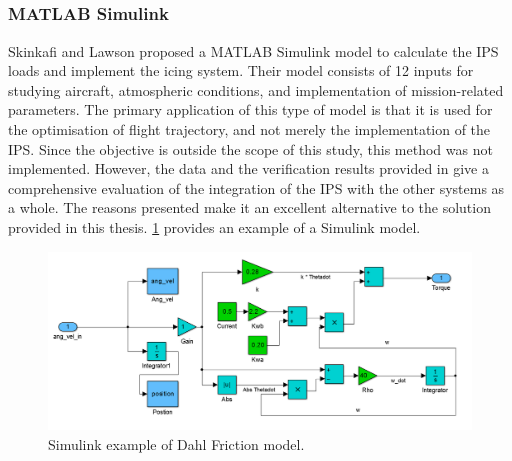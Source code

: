 \documentclass[english]{kththesis}
\begin{document}
\subsubsection {MATLAB Simulink \textsuperscript{\textregistered}}
Skinkafi and Lawson \cite{shinlaw1} proposed a MATLAB Simulink \cite{simulink} model to calculate the IPS loads and implement the icing system. Their model consists of 12 inputs for studying aircraft, atmospheric conditions, and implementation of mission-related parameters. The primary application of this type of model is that it is used for the optimisation of flight trajectory, and not merely the implementation of the IPS. Since the objective is outside the scope of this study, this method was not implemented. However, the data and the verification results provided in \cite{shinlaw1} give a comprehensive evaluation of the integration of the IPS with the other systems as a whole. The reasons presented make it an excellent alternative to the solution provided in this thesis. \ref{fig:simulink} provides an example of a Simulink model.
\begin{figure}[!htb]
    \centering
    \includegraphics[width=1\textwidth]{IPS/Bilde_av_Dahl_model.png}
    \caption{Simulink example of Dahl Friction model.}
    \label{fig:simulink}
\end{figure}
\end{document}
